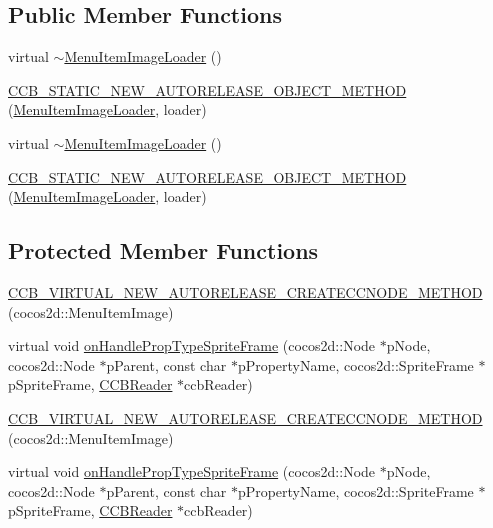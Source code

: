 \subsection*{Public Member Functions}
\begin{DoxyCompactItemize}
\item 
virtual \hyperlink{classcocosbuilder_1_1MenuItemImageLoader_ac37acbec28878ffee971e53960c47c7f}{$\sim$\+Menu\+Item\+Image\+Loader} ()
\item 
\hyperlink{classcocosbuilder_1_1MenuItemImageLoader_a314648054590bae4b58355441f8400c5}{C\+C\+B\+\_\+\+S\+T\+A\+T\+I\+C\+\_\+\+N\+E\+W\+\_\+\+A\+U\+T\+O\+R\+E\+L\+E\+A\+S\+E\+\_\+\+O\+B\+J\+E\+C\+T\+\_\+\+M\+E\+T\+H\+OD} (\hyperlink{classcocosbuilder_1_1MenuItemImageLoader}{Menu\+Item\+Image\+Loader}, loader)
\item 
virtual \hyperlink{classcocosbuilder_1_1MenuItemImageLoader_ac37acbec28878ffee971e53960c47c7f}{$\sim$\+Menu\+Item\+Image\+Loader} ()
\item 
\hyperlink{classcocosbuilder_1_1MenuItemImageLoader_a314648054590bae4b58355441f8400c5}{C\+C\+B\+\_\+\+S\+T\+A\+T\+I\+C\+\_\+\+N\+E\+W\+\_\+\+A\+U\+T\+O\+R\+E\+L\+E\+A\+S\+E\+\_\+\+O\+B\+J\+E\+C\+T\+\_\+\+M\+E\+T\+H\+OD} (\hyperlink{classcocosbuilder_1_1MenuItemImageLoader}{Menu\+Item\+Image\+Loader}, loader)
\end{DoxyCompactItemize}
\subsection*{Protected Member Functions}
\begin{DoxyCompactItemize}
\item 
\hyperlink{classcocosbuilder_1_1MenuItemImageLoader_a077e8fc21f499ba6c89bffd749e89c9e}{C\+C\+B\+\_\+\+V\+I\+R\+T\+U\+A\+L\+\_\+\+N\+E\+W\+\_\+\+A\+U\+T\+O\+R\+E\+L\+E\+A\+S\+E\+\_\+\+C\+R\+E\+A\+T\+E\+C\+C\+N\+O\+D\+E\+\_\+\+M\+E\+T\+H\+OD} (cocos2d\+::\+Menu\+Item\+Image)
\item 
virtual void \hyperlink{classcocosbuilder_1_1MenuItemImageLoader_a7d3980370200bf7299357dec8fb8b701}{on\+Handle\+Prop\+Type\+Sprite\+Frame} (cocos2d\+::\+Node $\ast$p\+Node, cocos2d\+::\+Node $\ast$p\+Parent, const char $\ast$p\+Property\+Name, cocos2d\+::\+Sprite\+Frame $\ast$p\+Sprite\+Frame, \hyperlink{classcocosbuilder_1_1CCBReader}{C\+C\+B\+Reader} $\ast$ccb\+Reader)
\item 
\hyperlink{classcocosbuilder_1_1MenuItemImageLoader_a077e8fc21f499ba6c89bffd749e89c9e}{C\+C\+B\+\_\+\+V\+I\+R\+T\+U\+A\+L\+\_\+\+N\+E\+W\+\_\+\+A\+U\+T\+O\+R\+E\+L\+E\+A\+S\+E\+\_\+\+C\+R\+E\+A\+T\+E\+C\+C\+N\+O\+D\+E\+\_\+\+M\+E\+T\+H\+OD} (cocos2d\+::\+Menu\+Item\+Image)
\item 
virtual void \hyperlink{classcocosbuilder_1_1MenuItemImageLoader_a7d3980370200bf7299357dec8fb8b701}{on\+Handle\+Prop\+Type\+Sprite\+Frame} (cocos2d\+::\+Node $\ast$p\+Node, cocos2d\+::\+Node $\ast$p\+Parent, const char $\ast$p\+Property\+Name, cocos2d\+::\+Sprite\+Frame $\ast$p\+Sprite\+Frame, \hyperlink{classcocosbuilder_1_1CCBReader}{C\+C\+B\+Reader} $\ast$ccb\+Reader)
\end{DoxyCompactItemize}
